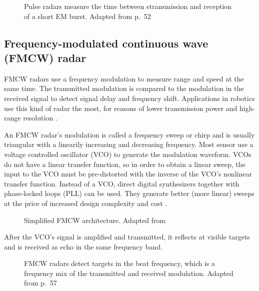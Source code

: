 \begin{figure}[htp]
    \centering
    \label{fig:radar_pulse}
    \def\svgwidth{10cm}
    
    \caption{Pulse radars measure the time between stransmission and reception of a short EM burst. Adapted from \cite{Adams2012} p.~52}
\end{figure}


\subsection{Frequency-modulated continuous wave (FMCW)
radar}\label{frequency-modulated-continuous-wave-fmcw-radar}

FMCW radars use a frequency modulation to measure range and speed at the
same time. The transmitted modulation is compared to the modulation in
the received signal to detect signal delay and frequency shift.
Applications in robotics use this kind of radar the most, for reasons of
lower transmission power and high-range resolution \cite{Adams2012}.

An FMCW radar's modulation is called a frequency sweep or chirp and is
usually triangular with a linearily increasing and decreasing frequency.
Most sensor use a voltage controlled oscillator (VCO) to generate the
modulation waveform. VCOs do not have a linear transfer function, so in
order to obtain a linear sweep, the input to the VCO must be
pre-distorted with the inverse of the VCO's nonlinear transfer function.
Instead of a VCO, direct digital synthesizers together with phase-locked
loops (PLL) can be used. They generate better (more linear) sweeps at
the price of increased design complexity and cost \cite{Ernst2016}.

\begin{figure}[htp]
    \centering
    \label{fig:fmcw_blocks}
    \def\svgwidth{\linewidth}
    
    \caption{Simplified FMCW architecture. Adapted from \cite{VanZeijl2014}}
\end{figure}

After the VCO's signal is amplified and transmitted, it reflects at
visible targets and is received as echo in the same frequency band.

\begin{figure}[htp]
    \centering
    \label{fig:fmcw_triangular}
    \def\svgwidth{10cm}
    
    \caption{FMCW radars detect targets in the beat frequency, which is a frequency mix of the transmitted and received modulation. Adapted from \cite{Adams2012} p.~57}
\end{figure}

